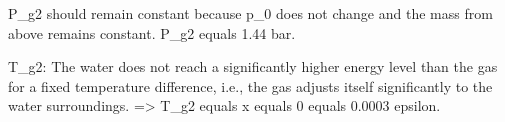 P_g2 should remain constant because p_0 does not change and the mass from above remains constant.  
P_g2 equals 1.44 bar.  

T_g2: The water does not reach a significantly higher energy level than the gas for a fixed temperature difference, i.e., the gas adjusts itself significantly to the water surroundings.  
=> T_g2 equals x equals 0 equals 0.0003 epsilon.
